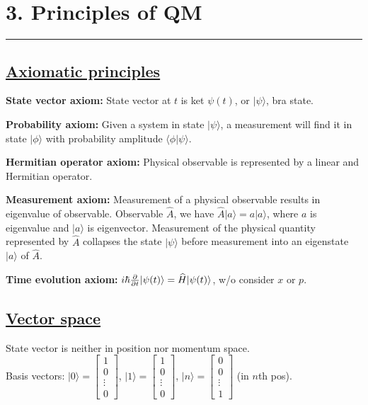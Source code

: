\section{3. Principles of QM} \hrule height 0.3pt \thinspace

\subsection{\underline{Axiomatic principles}}

\textbf{State vector axiom:} State vector at $t$ is ket $\psi(t)$, or $|\psi \rangle$, bra state.

\textbf{Probability axiom:} Given a system in state $|\psi \rangle$, a measurement will find it in state $|\phi \rangle$ with probability amplitude $\langle \phi | \psi \rangle$. 

\textbf{Hermitian operator axiom:} Physical observable is represented by a linear and Hermitian operator.

\textbf{Measurement axiom:} Measurement of a physical observable results in eigenvalue of observable. Observable $\widehat{A}$, we have $\widehat{A} | a \rangle = a | a \rangle$, where $a$ is eigenvalue and $|a \rangle$ is eigenvector. Measurement of the physical quantity represented by $\widehat{A}$ collapses the state $|\psi \rangle$ before measurement into an eigenstate $|a \rangle$ of $\widehat{A}$.

\textbf{Time evolution axiom:} $i \hbar \pdv{}{t} | \psi(t) \rangle = \widehat{H} |\psi(t) \rangle$, w/o consider $x$ or $p$.

\subsection{\underline{Vector space}}
State vector is neither in position nor momentum space. \\
Basis vectors:
$|0 \rangle = \begin{bmatrix}
    1 \\
    0 \\
    \vdots \\
    0
    \end{bmatrix}$,
$|1 \rangle = \begin{bmatrix}
    1 \\
    0 \\
    \vdots \\
    0
    \end{bmatrix}$,
$|n \rangle = \begin{bmatrix}
    0 \\
    0 \\
    \vdots \\
    1
\end{bmatrix}$ (in $n$th pos).

